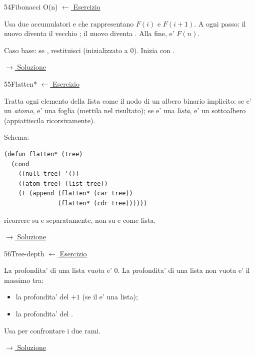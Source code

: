 \label{hint:54}
\begin{hintbox}{54}{Fibonacci O(n)}
\small\color{black!55}\hyperref[ex:54]{$\leftarrow$ Esercizio}\normalsize\color{black}

Usa due accumulatori  e  che rappresentano
$F(i)$ e $F(i+1)$. A ogni passo: il nuovo  diventa
il vecchio ; il nuovo  diventa .
Alla fine,  e' $F(n)$.

Caso base: se , restituisci  (inizializzato a 0).
Inizia con .

\small\color{black!55}\hyperref[sol:54]{$\rightarrow$ Soluzione}\normalsize\color{black}
\end{hintbox}

\label{hint:55}
\begin{hintbox}{55}{Flatten*}
\small\color{black!55}\hyperref[ex:55]{$\leftarrow$ Esercizio}\normalsize\color{black}

Tratta ogni elemento della lista come il nodo di un albero binario
implicito: se e' un \textit{atomo}, e' una foglia (mettila nel risultato);
se e' una \textit{lista}, e' un sottoalbero (appiattiscila ricorsivamente).

Schema:
\begin{lstlisting}
(defun flatten* (tree)
  (cond
    ((null tree) '())
    ((atom tree) (list tree))
    (t (append (flatten* (car tree))
               (flatten* (cdr tree))))))
\end{lstlisting}
 ricorrere su  e  separatamente,
non su  e  come lista.

\small\color{black!55}\hyperref[sol:55]{$\rightarrow$ Soluzione}\normalsize\color{black}
\end{hintbox}

\label{hint:56}
\begin{hintbox}{56}{Tree-depth}
\small\color{black!55}\hyperref[ex:56]{$\leftarrow$ Esercizio}\normalsize\color{black}

La profondita' di una lista vuota e' 0.
La profondita' di una lista non vuota e' il massimo tra:
\begin{itemize}[leftmargin=2em]
  \item la profondita' del  $+1$ (se il  e' una lista);
  \item la profondita' del .
\end{itemize}
Usa  per confrontare i due rami.

\small\color{black!55}\hyperref[sol:56]{$\rightarrow$ Soluzione}\normalsize\color{black}
\end{hintbox}

